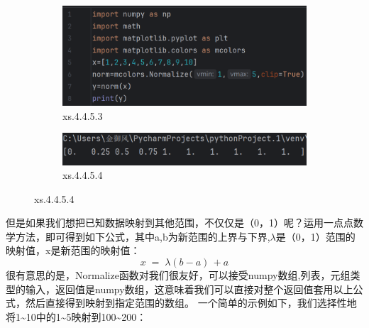 \documentclass[12pt]{article}
\begin{document}
\begin{figure}[H]
    \centering
    \begin{subfigure}[b]{0.6\textwidth}
        \includegraphics[width=\textwidth]{normalize program2.png} %
        \caption{xs.4.4.5.3}
        \label{fig:line-graph2}
    \end{subfigure}
    \hfill
    \begin{subfigure}[b]{0.6\textwidth}
        \includegraphics[width=\textwidth]{normalize output2.png} %
        \caption{xs.4.4.5.4}
        \label{fig:line-graph2-pic2}
    \end{subfigure}
\end{figure}
但是如果我们想把已知数据映射到其他范围，不仅仅是（0，1）呢？运用一点点数学方法，即可得到如下公式，其中a,b为新范围的上界与下界,$\lambda$是（0，1）范围的映射值，x是新范围的映射值：
\[x\;=\;\lambda (b-a)\,+a\]
很有意思的是，Normalize函数对我们很友好，可以接受numpy数组,列表，元组类型的输入，返回值是numpy数组，这意味着我们可以直接对整个返回值套用以上公式，然后直接得到映射到指定范围的数组。
一个简单的示例如下，我们选择性地将1\~{}10中的1\~{}5映射到100\~{}200：
\end{document}
